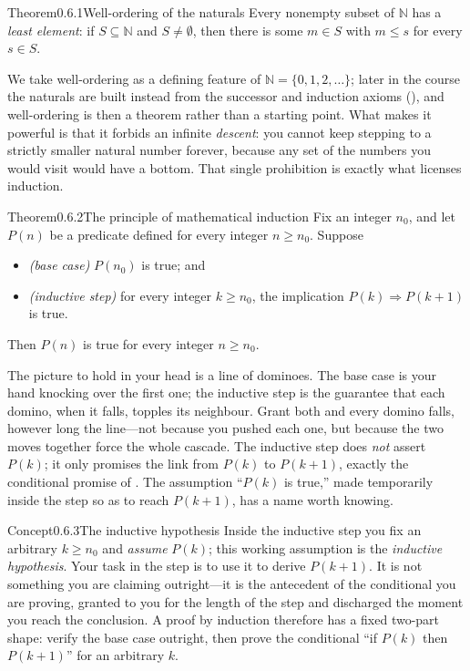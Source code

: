 \documentclass[main.tex]{subfiles}
\begin{document}
\begin{Obj}{Theorem}{0.6.1}{Well-ordering of the naturals}
Every nonempty subset of $\mathbb N$ has a \emph{least element}: if $S\subseteq\mathbb N$ and
$S\ne\emptyset$, then there is some $m\in S$ with $m\le s$ for every $s\in S$.
\end{Obj}

\noindent We take well-ordering as a defining feature of $\mathbb N=\{0,1,2,\dots\}$; later in the
course the naturals are built instead from the successor and induction axioms
(), and well-ordering is then a theorem rather than a starting point. What makes it powerful is that it forbids an infinite \emph{descent}: you
cannot keep stepping to a strictly smaller natural number forever, because any set of the numbers you
would visit would have a bottom. That single prohibition is exactly what licenses induction.

\begin{Obj}{Theorem}{0.6.2}{The principle of mathematical induction}
Fix an integer $n_0$, and let $P(n)$ be a predicate defined for every integer $n\ge n_0$. Suppose
\begin{itemize}
  \item \emph{(base case)} $P(n_0)$ is true; and
  \item \emph{(inductive step)} for every integer $k\ge n_0$, the implication $P(k)\Rightarrow P(k+1)$
        is true.
\end{itemize}
Then $P(n)$ is true for every integer $n\ge n_0$.
\end{Obj}

\noindent The picture to hold in your head is a line of dominoes. The base case is your hand knocking
over the first one; the inductive step is the guarantee that each domino, when it falls, topples its
neighbour. Grant both and every domino falls, however long the line---not because you pushed each one,
but because the two moves together force the whole cascade. The inductive step does \emph{not} assert
$P(k)$; it only promises the link from $P(k)$ to $P(k+1)$, exactly the conditional promise of
. The assumption ``$P(k)$ is true,'' made temporarily inside the step so as to reach
$P(k+1)$, has a name worth knowing.

\begin{ObjL}{Concept}{0.6.3}{The inductive hypothesis}
Inside the inductive step you fix an arbitrary $k\ge n_0$ and \emph{assume} $P(k)$; this working
assumption is the \emph{inductive hypothesis}. Your task in the step is to use it to derive $P(k+1)$.
It is not something you are claiming outright---it is the antecedent of the conditional you are
proving, granted to you for the length of the step and discharged the moment you reach the conclusion.
A proof by induction therefore has a fixed two-part shape: verify the base case outright, then prove
the conditional ``if $P(k)$ then $P(k+1)$'' for an arbitrary $k$.
\end{ObjL}
\end{document}
